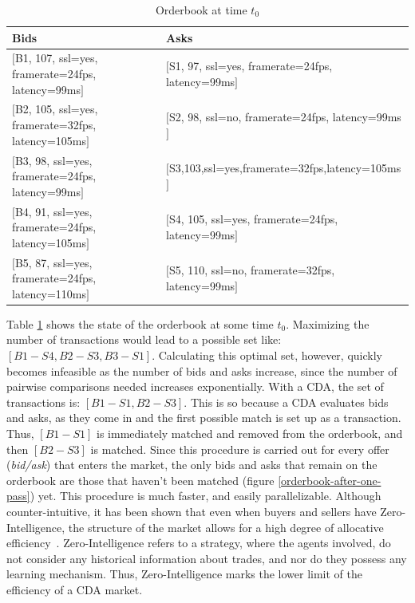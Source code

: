 \documentclass[10pt,journal,compsoc]{IEEEtran}
\begin{document}
\begin{table}
\centering
\begin{tabular}{ll}
\toprule
Bids & Asks \\
\midrule
$[$\small{B1, 107, ssl=yes, framerate=24fps, latency=99ms}$]$ & $[$\small{S1, 97, ssl=yes, framerate=24fps, latency=99ms}$]$ \\
$[$\small{B2, 105, ssl=yes, framerate=32fps, latency=105ms}$]$ & $[$\small{S2, 98, ssl=no, framerate=24fps, latency=99ms}$]$ \\
$[$\small{B3, 98, ssl=yes, framerate=24fps, latency=99ms}$]$ & $[$\small{S3,103,ssl=yes,framerate=32fps,latency=105ms}$]$ \\
$[$\small{B4, 91, ssl=yes, framerate=24fps, latency=105ms}$]$ & $[$\small{S4, 105, ssl=yes, framerate=24fps, latency=99ms}$]$ \\
$[$\small{B5, 87, ssl=yes, framerate=24fps, latency=110ms}$]$ & $[$\small{S5, 110, ssl=no, framerate=32fps, latency=99ms}$]$ \\
\bottomrule
\end{tabular}
\caption{Orderbook at time $t_{0}$ \label{orderbook}}
\end{table}
Table \ref{orderbook} shows the state of the orderbook at some time \textit{$t_{0}$}. Maximizing the number of transactions would lead to a possible set like: $[B1-S4, B2-S3, B3-S1]$. Calculating this optimal set, however, quickly becomes infeasible as the number of bids and asks increase, since the number of pairwise comparisons needed increases exponentially.  With a CDA, the set of transactions is: $[B1-S1, B2-S3]$. This is so because a CDA evaluates bids and asks, as they come in and the first possible match is set up as a transaction. Thus, $[B1-S1]$ is immediately matched and removed from the orderbook, and then $[B2-S3]$ is matched.  Since this procedure is carried out for every offer (\textit{bid/ask}) that enters the market, the only bids and asks that remain on the orderbook are those that haven't been matched (figure \ref{orderbook-after-one-pass}) yet. This procedure is much faster, and easily parallelizable. Although counter-intuitive, it has been shown that even when buyers and sellers have Zero-Intelligence, the structure of the market allows for a high degree of allocative efficiency~\cite{Gode1993Allocative}. Zero-Intelligence refers to a strategy, where the agents involved, do not consider any historical information about trades, and nor do they possess any learning mechanism. Thus, Zero-Intelligence marks the lower limit of the efficiency of a CDA market.
\end{document}
